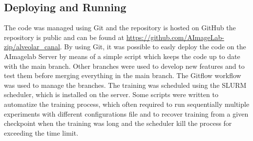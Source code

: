 \subsection{Deploying and Running}
The code was managed using Git and the repository is hosted on GitHub the
repository is public and can be found at \url{https://github.com/AImageLab-zip/alveolar\_canal}.
By using Git, it was possible to easly deploy the code on the AImagelab Server by
means of a simple script which keeps the code up to date with the main branch.
Other branches were used to develop new features and to test them before merging
everything in the main branch. The Gitflow workflow was used to manage the
branches. The training was scheduled using the SLURM scheduler, which is
installed on the server. Some scripts were written to automatize the training
process, which often required to run sequentially multiple experiments with
different configurations file and to recover training from a given checkpoint
when the training was long and the scheduler kill the process for exceeding the
time limit.
